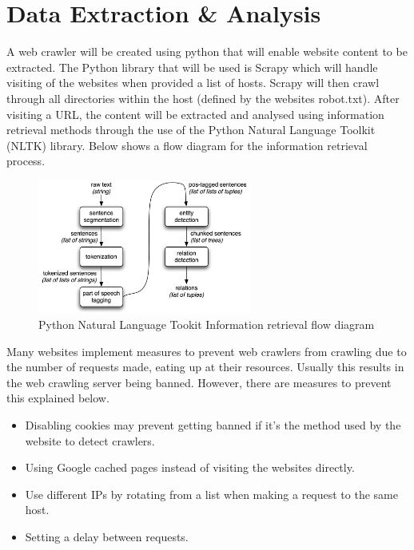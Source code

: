 \section{Data Extraction \& Analysis}

A web crawler will be created using python that will enable website content to be extracted. The Python library that will be used is Scrapy which will handle visiting of the websites when provided a list of hosts. Scrapy will then crawl through all directories within the host (defined by the websites robot.txt). After visiting a URL, the content will be extracted and analysed using information retrieval methods through the use of the Python Natural Language Toolkit (NLTK) library. Below shows a flow diagram for the information retrieval process.

\begin{figure}
  \centering
  \begin{minipage}{7cm}
    \centering
    \includegraphics[width=7cm]{inc/ie-architecture.jpg}
    \caption{Python Natural Language Tookit Information retrieval flow diagram}
    \label{fig:information_retrieval}
  \end{minipage}
\end{figure}

Many websites implement measures to prevent web crawlers from crawling due to the number of requests made, eating up at their resources. Usually this results in the web crawling server being banned. However, there are measures to prevent this explained below.

\begin{itemize}
  \item Disabling cookies may prevent getting banned if it’s the method used by the website to detect crawlers.
  \item Using Google cached pages instead of visiting the websites directly.
  \item Use different IPs by rotating from a list when making a request to the same host.
  \item Setting a delay between requests.
\end{itemize}

